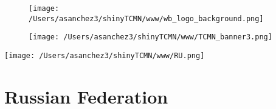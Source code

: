 \documentclass{article}\usepackage[]{graphicx}\usepackage[]{color}
\begin{document}
%

\begin{figure}
  \vspace{-3ex} %
  \hspace{-7ex} %
  \texttt{[image: /Users/asanchez3/shinyTCMN/www/wb\_logo\_background.png]}
\end{figure}
\begin{figure}
  \begin{minipage}[t]{0.99\textwidth} %
      \vspace{-30ex}
      \hspace{-2ex}
      \raggedright{\texttt{[image: /Users/asanchez3/shinyTCMN/www/TCMN\_banner3.png]}}
  \end{minipage}
\end{figure}
%
\begin{minipage}[t]{0.99\textwidth} %
  \vspace{-1.5cm}
  \begin{minipage}[c]{0.36\textwidth} 
    \begin{minipage}[c]{0.28\textwidth} %
      \texttt{[image: /Users/asanchez3/shinyTCMN/www/RU.png]}
    \end{minipage}
    \begin{minipage}[c]{0.70\textwidth} %
      \section*{\color{blue!40!black}Russian Federation}
    \end{minipage}
  \end{minipage}
  \begin{minipage}[c]{0.63\textwidth}
    \begin{flushleft}  
    \end{flushleft} 
  \end{minipage}  
\end{minipage} %
\end{document}
